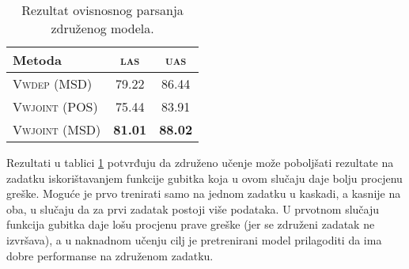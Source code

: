 \begin{table}
\centering
\caption{Rezultat ovisnosnog parsanja združenog modela.}
\label{table:depparsing:joint}
\begin{tabular}{|l|c|c|}
\hline
Metoda                 & \textsc{las}   & \textsc{uas}    \\ \hline \hline
\textsc{Vwdep}   (MSD) & 79.22          & 86.44           \\
\textsc{Vwjoint} (POS) & 75.44          & 83.91           \\
\textsc{Vwjoint} (MSD) & \textbf{81.01} & \textbf{88.02}  \\ \hline
\end{tabular}
\end{table}

Rezultati u tablici \ref{table:depparsing:joint} potvrđuju da združeno učenje
može poboljšati rezultate na zadatku iskorištavanjem funkcije gubitka koja u
ovom slučaju daje bolju procjenu greške. Moguće je prvo trenirati samo na jednom
zadatku u kaskadi, a kasnije na oba, u slučaju da za prvi zadatak postoji više
podataka. U prvotnom slučaju funkcija gubitka daje lošu procjenu prave greške
(jer se združeni zadatak ne izvršava), a u naknadnom učenju cilj je pretrenirani
model prilagoditi da ima dobre performanse na združenom zadatku.
